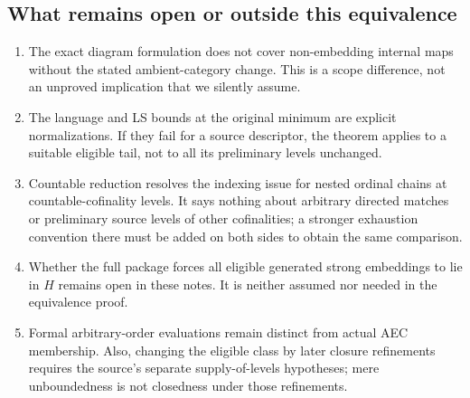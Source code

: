 \subsection{What remains open or outside this equivalence}
\begin{enumerate}[leftmargin=*]
\item The exact diagram formulation does not cover non-embedding
internal maps without the stated ambient-category change. This is a
scope difference, not an unproved implication that we silently assume.
\item The language and LS bounds at the original minimum are explicit
normalizations. If they fail for a source descriptor, the theorem applies
to a suitable eligible tail, not to all its preliminary levels unchanged.
\item Countable reduction resolves the indexing issue for nested
ordinal chains at countable-cofinality levels. It says nothing about
arbitrary directed matches or preliminary source levels of other
cofinalities; a stronger exhaustion convention there must be added
on both sides to obtain the same comparison.
\item Whether the full package forces all eligible generated strong
embeddings to lie in $H$ remains open in these notes. It is neither
assumed nor needed in the equivalence proof.
\item Formal arbitrary-order evaluations remain distinct from actual
AEC membership. Also, changing the eligible class by later closure
refinements requires the source's separate supply-of-levels hypotheses;
mere unboundedness is not closedness under those refinements.
\end{enumerate}
